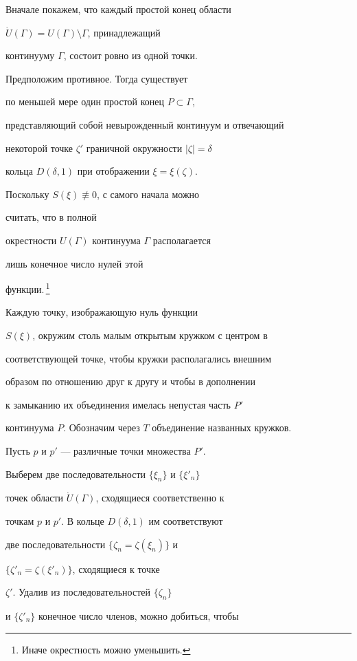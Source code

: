 \begin{pf}


Вначале покажем, что каждый простой конец области


$\Dot{U}(\Gamma)=U(\Gamma)\setminus\Gamma$, принадлежащий 


континууму $\Gamma$, состоит ровно из одной точки. 


Предположим противное. Тогда существует 


по меньшей мере один простой конец $P\subset\Gamma$, 


представляющий собой невырожденный континуум и отвечающий 


некоторой точке $\zeta'$ граничной окружности $|\zeta|=\delta$ 


кольца $D(\delta,1)$ при отображении $\xi=\xi(\zeta)$. 


Поскольку $S(\xi)\not\equiv 0$, с самого начала можно 


считать, что в полной


окрестности $U(\Gamma)$ континуума $\Gamma$ располагается 


лишь конечное число нулей этой


функции.\,\footnote{Иначе окрестность можно уменьшить.}


Каждую точку, изображающую нуль функции


$S(\xi)$, окружим столь малым открытым кружком с центром в 


соответствующей точке, чтобы кружки располагались внешним 


образом по отношению друг к другу и чтобы в дополнении 


к замыканию их объединения имелась непустая часть $P'$ 


континуума $P$. Обозначим через $T$ объединение названных кружков.


Пусть $p$ и $p'$ ---  различные точки множества $P'$. 


Выберем две последовательности $\{\xi_{n}\}$ и $\{\xi'_{n}\}$ 


точек области $\Dot{U}(\Gamma)$, сходящиеся соответственно к 


точкам $p$ и $p'$. В кольце $D(\delta,1)$ им соответствуют 


две последовательности $\{\zeta_{n}=\zeta(\xi_{n})\}$ и


$\{\zeta'_{n}=\zeta(\xi'_{n})\}$, сходящиеся к точке


$\zeta'$. Удалив из последовательностей $\{\zeta_{n}\}$


и $\{\zeta'_{n}\}$ конечное число членов, можно добиться, чтобы



\end{pf}
